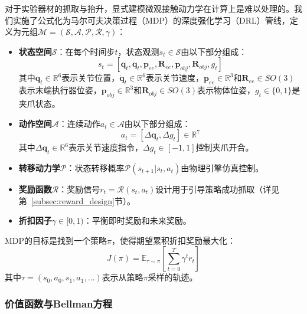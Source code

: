 对于实验器材的抓取与抬升，显式建模微观接触动力学在计算上是难以处理的。我们实施了公式化为马尔可夫决策过程（MDP）的深度强化学习（DRL）管线，定义为元组$\mathcal{M} = (\mathcal{S}, \mathcal{A}, \mathcal{P}, \mathcal{R}, \gamma)$：

\begin{itemize}
    \item \textbf{状态空间}$\mathcal{S}$：在每个时间步$t$，状态观测$s_t \in \mathcal{S}$由以下部分组成：
    \begin{equation}
        s_t = [\mathbf{q}_t, \dot{\mathbf{q}}_t, \mathbf{p}_{ee}, \mathbf{R}_{ee}, \mathbf{p}_{obj}, \mathbf{R}_{obj}, g_t]
    \end{equation}
    其中$\mathbf{q}_t \in \mathbb{R}^6$表示关节位置，$\dot{\mathbf{q}}_t \in \mathbb{R}^6$表示关节速度，$\mathbf{p}_{ee} \in \mathbb{R}^3$和$\mathbf{R}_{ee} \in SO(3)$表示末端执行器位姿，$\mathbf{p}_{obj} \in \mathbb{R}^3$和$\mathbf{R}_{obj} \in SO(3)$表示物体位姿，$g_t \in \{0, 1\}$是夹爪状态。

    \item \textbf{动作空间}$\mathcal{A}$：连续动作$a_t \in \mathcal{A}$由以下部分组成：
    \begin{equation}
        a_t = [\Delta\mathbf{q}_t, \Delta g_t] \in \mathbb{R}^7
    \end{equation}
    其中$\Delta\mathbf{q}_t \in \mathbb{R}^6$表示关节速度指令，$\Delta g_t \in [-1, 1]$控制夹爪开合。

    \item \textbf{转移动力学}$\mathcal{P}$：状态转移概率$\mathcal{P}(s_{t+1}|s_t, a_t)$由物理引擎仿真控制。

    \item \textbf{奖励函数}$\mathcal{R}$：奖励信号$r_t = \mathcal{R}(s_t, a_t)$设计用于引导策略成功抓取（详见第~\ref{subsec:reward_design}节）。

    \item \textbf{折扣因子}$\gamma \in [0, 1)$：平衡即时奖励和未来奖励。
\end{itemize}

MDP的目标是找到一个策略$\pi$，使得期望累积折扣奖励最大化：
\begin{equation}
    J(\pi) = \mathbb{E}_{\tau \sim \pi} \left[ \sum_{t=0}^{T} \gamma^t r_t \right]
\end{equation}
其中$\tau = (s_0, a_0, s_1, a_1, \dots)$表示从策略$\pi$采样的轨迹。

\subsubsection{价值函数与Bellman方程}
\label{subsec:bellman}

